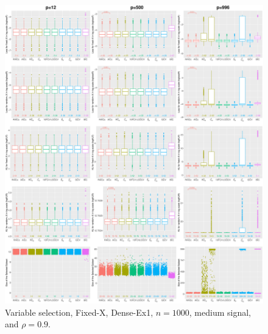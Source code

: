 \begin{figure}[!ht]
\centering
\includegraphics[width=\textwidth]{figures/supplement/fixedx/subset_selection/Dense-Ex1_n1000_msnr_rho09.eps}
\caption{Variable selection, Fixed-X, Dense-Ex1, $n=1000$, medium signal, and $\rho=0.9$.}
\end{figure}
\clearpage
